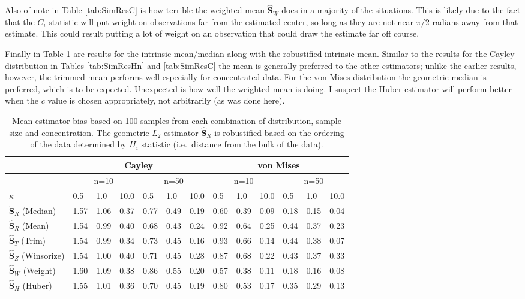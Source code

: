 \documentclass{article}\usepackage{graphicx, color}
\newcommand{\GeomMean}{{\widehat{\bm S}_{R}}}
\newcommand{\GeomMedian}{{\widetilde{\bm S}_{R}}}
\newcommand{\HuberMean}{{\widehat{\bm S}_H}}
\newcommand{\WeightMean}{{\widehat{\bm S}_W}}
\newcommand{\TrimMean}{{\widehat{\bm S}_T}}
\newcommand{\WinzMean}{{\widehat{\bm S}_Z}}
\newcommand{\red}[1]{{\color{red} #1}}
\begin{document}
Also of note in Table \ref{tab:SimResC} is how terrible the weighted mean $\WeightMean$ does in a majority of the situations.  This is likely due to the fact that the $C_i$ statistic will put weight on observations far from the estimated center, so long as they are not near $\pi/2$ radians away from that estimate.  This could result putting a lot of weight on an observation that could draw the estimate far off course.

Finally in Table \ref{tab:SimResHnIntrin} are results for the intrinsic mean/median along with the robustified intrinsic mean. Similar to the results for the Cayley distribution in Tables \ref{tab:SimResHn} and \ref{tab:SimResC} the mean is generally preferred to the other estimators; unlike the earlier results, however, the trimmed mean performs well especially for concentrated data.  For the von Mises distribution the geometric median is preferred, which is to be expected.  Unexpected is how well the weighted mean is doing.  I suspect the Huber estimator will perform better when the $c$ value is chosen appropriately, not arbitrarily (as was done here).

\begin{table}[ht]
\centering
\begin{tabular}{l|lll|lll|lll|lll}
  \hline
 & \multicolumn{6}{|c|}{Cayley} & \multicolumn{6}{|c}{von Mises}   \\ 
\hline
   &  \multicolumn{3}{|c|}{n=10} & \multicolumn{3}{|c|}{n=50} & \multicolumn{3}{|c|}{n=10} & \multicolumn{3}{|c}{n=50} \\
  $\kappa$ &  0.5 &  1.0 & 10.0 &  0.5 &  1.0 & 10.0 &  0.5 &  1.0 & 10.0 &  0.5 &  1.0 & 10.0 \\ \hline
 $\GeomMedian$ (Median) & 1.57 & 1.06 & 0.37 & 0.77 & 0.49 & 0.19 & 0.60 & 0.39 & \red{0.09} & \red{0.18} & \red{0.15} & \red{0.04} \\ 
 $\GeomMean$ (Mean) & \red{1.54} & \red{0.99} & 0.40 & \red{0.68} & \red{0.43} & 0.24 & 0.92 & 0.64 & 0.25 & 0.44 & 0.37 & 0.23 \\ 
 $\TrimMean$ (Trim) & \red{1.54} & \red{0.99} & \red{0.34} & 0.73 & 0.45 & \red{0.16} & 0.93 & 0.66 & 0.14 & 0.44 & 0.38 & 0.07 \\ 
 $\WinzMean$ (Winsorize) & \red{1.54} & 1.00 & 0.40 & 0.71 & 0.45 & 0.28 & 0.87 & 0.68 & 0.22 & 0.43 & 0.37 & 0.33 \\ 
 $\WeightMean$ (Weight) & 1.60 & 1.09 & 0.38 & 0.86 & 0.55 & 0.20 & \red{0.57} & \red{0.38} & 0.11 & \red{0.18} & 0.16 & 0.08 \\ 
 $\HuberMean$ (Huber) & 1.55 & 1.01 & 0.36 & 0.70 & 0.45 & 0.19 & 0.80 & 0.53 & 0.17 & 0.35 & 0.29 & 0.13 \\ 
   \hline
\end{tabular}
\caption{Mean estimator bias based on 100 samples from each combination of distribution, sample size and concentration.  The geometric $L_2$ estimator $\GeomMean$ is robustified based on the ordering of the data determined by $H_i$ statistic (i.e.~distance from the bulk of the data).}
\label{tab:SimResHnIntrin}
\end{table}




\clearpage
%

\end{document}
